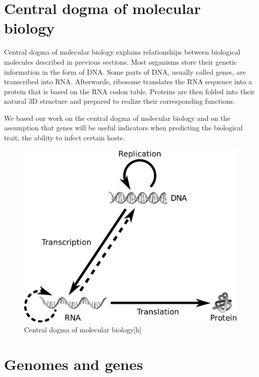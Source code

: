 \section{Central dogma of molecular biology}
Central dogma of molecular biology explains relationships between biological molecules described in previous sections.
Most organisms store their genetic information in the form of DNA.
Some parts of DNA, usually called genes, are transcribed into RNA.
Afterwards, ribosome translates the RNA sequence into a protein that is based on the RNA codon table.
Proteins are then folded into their natural 3D structure and prepared to realize their corresponding functions.

We based our work on the central dogma of molecular biology and on the assumption that genes will be useful indicators when predicting the biological trait, the ability to infect certain hosts.

\begin{figure}[htp]
\includegraphics[width=\linewidth]{./images/central_dogma.png}
\centering
\caption{Central dogma of molecular biology[h]}
\end{figure}

\section{Genomes and genes}

